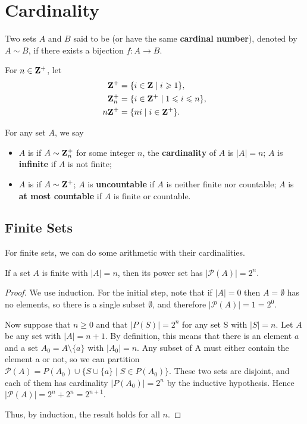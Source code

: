 \section{Cardinality}
\begin{definition}
Two sets $A$ and $B$ said to be  (or have the same \textbf{cardinal number}), denoted by $A\sim B$, if there exists a bijection $f:A\to B$. 
\end{definition}

\begin{notation}
For $n\in\mathbf Z^+$, let
\begin{align*}
\mathbf Z^+&=\{i\in\mathbf Z\mid i\geqslant1\},\\
\mathbf Z_n^+&=\{i\in\mathbf Z^+\mid 1\leqslant i\leqslant n\},\\
n\mathbf Z^+&=\{ni\mid i\in\mathbf Z^+\}.
\end{align*}
\end{notation}

\begin{definition}
For any set $A$, we say
\begin{itemize}
\item $A$ is  if $A\sim\mathbf Z_n^+$ for some integer $n$, the \textbf{cardinality} of $A$ is $|A|=n$; $A$ is \textbf{infinite} if $A$ is not finite;
\item $A$ is  if $A\sim \mathbf Z^+$; $A$ is \textbf{uncountable} if $A$ is neither finite nor countable; $A$ is \textbf{at most countable} if $A$ is finite or countable.
\end{itemize}
\end{definition}

\subsection{Finite Sets}
For finite sets, we can do some arithmetic with their cardinalities.

\begin{proposition}
If a set $A$ is finite with $|A| = n$, then its power set has $|\mathcal{P}(A)| = 2^n$.
\end{proposition}

\begin{proof}
We use induction. For the initial step, note that if $|A| = 0$ then $A = \emptyset$ has no elements, so there is a single subset $\emptyset$, and therefore $|\mathcal{P}(A)| = 1 = 2^0$.

Now suppose that $n \ge 0$ and that $|P(S)| = 2^n$ for any set S with $|S| = n$. Let $A$ be any set with $|A| = n+1$. By definition, this means that there is an element $a$ and a set $A_0 = A\setminus\{a\}$ with $|A_0| = n$. Any subset of A must either contain the element a or not, so we can partition $\mathcal{P}(A) = P(A_0) \cup \{S \cup \{a\} \mid S \in P(A_0)\}$. These two sets are disjoint, and each of them has cardinality $|P(A_0)| = 2^n$ by the inductive hypothesis. Hence $|\mathcal{P}(A)| = 2^n + 2^n = 2^{n+1}$.

Thus, by induction, the result holds for all $n$.
\end{proof}

